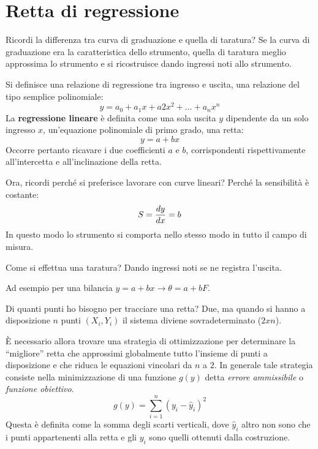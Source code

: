 \documentclass[a4paper, 15pt]{article}
\begin{document}
\section{Retta di regressione}
\begin{adjustwidth}{2in}{}		
	Ricordi la differenza tra curva di graduazione e quella di taratura? Se la curva di graduazione era la caratteristica dello strumento, quella di taratura meglio approssima lo strumento e si ricostruisce dando ingressi noti allo strumento. \newline 
	
	Si definisce una relazione di regressione tra ingresso e uscita, una relazione del tipo semplice polinomiale:
	\[ y = a_0 + a_1x + a2x^2 + \dots +a_nx^n\]
	La \textbf{regressione lineare} è definita come una sola uscita $y$ dipendente da un solo ingresso $x$, un'equazione polinomiale di primo grado, una retta:
	\[ y = a + bx\]
	Occorre pertanto ricavare i due coefficienti $ a $ e $ b $, corrispondenti rispettivamente all’intercetta e all’inclinazione della retta. \newline
	
	Ora, ricordi perché si preferisce lavorare con curve lineari? Perché la sensibilità è costante: 
	\[S = {dy\over dx} = b\]
	In questo modo lo strumento si comporta nello stesso modo in tutto il campo di misura. \newline 
	
	Come si effettua una taratura? Dando ingressi noti se ne registra l'uscita. \newline
	
	Ad esempio per una bilancia $y=a+bx \rightarrow \theta = a+bF$. \newline
	
	Di quanti punti ho bisogno per tracciare una retta? Due, ma quando si hanno a disposizione $ n $ punti $ (X_i,Y_i) $ il sistema diviene sovradeterminato ($ 2xn $). 
	
	È necessario allora trovare una strategia di ottimizzazione per determinare la “migliore” retta
	che approssimi globalmente tutto l’insieme di punti a disposizione e che riduca le equazioni vincolari da $ n $ a $ 2 $. In generale tale strategia consiste nella minimizzazione di una funzione $g(y)$ detta
	\textit{errore ammissibile} o \textit{funzione obiettivo}.
	\[g(y) = \sum_{i=1}^{n}(y_i-\hat{y}_i)^2\]
	Questa è definita come la somma degli scarti verticali, dove $\hat{y}_i$ altro non sono che i punti appartenenti alla retta e gli $y_i$ sono quelli ottenuti dalla costruzione. \newline 
	

\end{adjustwidth}
\end{document}
